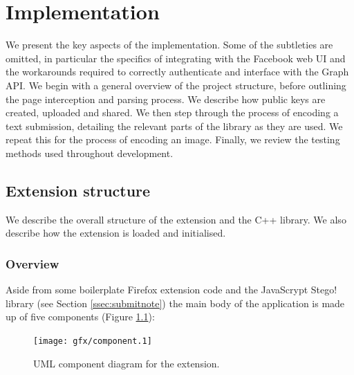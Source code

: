 \chapter{Implementation}\label{ch:implementation}
\label{imp}

We present the key aspects of the implementation. Some of the subtleties are omitted, in particular the specifics of integrating with the Facebook web UI and the workarounds required to correctly authenticate and interface with the Graph API. We begin with a general overview of the project structure, before outlining the page interception and parsing process. We describe how public keys are created, uploaded and shared. We then step through the process of encoding a text submission, detailing the relevant parts of the library as they are used. We repeat this for the process of encoding an image. Finally, we review the testing methods used throughout development.


\FloatBarrier
\section{Extension structure}

We describe the overall structure of the extension and the C++ library. We also describe how the extension is loaded and initialised.

\subsection{Overview}
\label{ssec:over}

    Aside from some boilerplate Firefox extension code and the JavaScrypt Stego! library (see Section \ref{ssec:submitnote}) the main body of the application is made up of five components (Figure \ref{uml:component}):

    \begin{figure}[tb]
        \begin{center}
                \texttt{[image: gfx/component.1]}
            \caption{UML component diagram for the extension.}
            \label{uml:component}
        \end{center}
    \end{figure}
    
